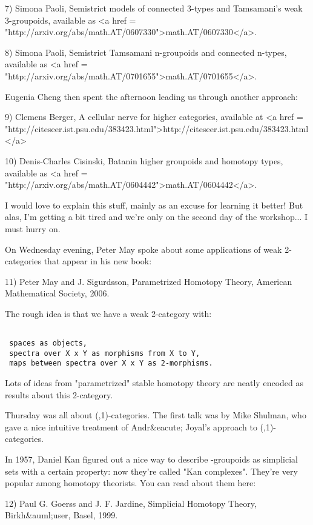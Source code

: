 7) Simona Paoli, Semistrict models of connected 3-types and 
Tamsamani's weak 3-groupoids, available as 
<a href = "http://arxiv.org/abs/math.AT/0607330">math.AT/0607330</a>.

8) Simona Paoli, Semistrict Tamsamani n-groupoids and connected 
n-types, available as 
<a href = "http://arxiv.org/abs/math.AT/0701655">math.AT/0701655</a>.

Eugenia Cheng then spent the afternoon leading us through another
approach:

9) Clemens Berger, A cellular nerve for higher categories, 
available at <a href = "http://citeseer.ist.psu.edu/383423.html">http://citeseer.ist.psu.edu/383423.html</a>

10) Denis-Charles Cisinski, Batanin higher groupoids and homotopy 
types, available as <a href = "http://arxiv.org/abs/math.AT/0604442">math.AT/0604442</a>.

I would love to explain this stuff, mainly as an excuse for 
learning it better!  But alas, I'm getting a bit tired and we're
only on the second day of the workshop... I must hurry on.

On Wednesday evening, Peter May spoke about some applications of
weak 2-categories that appear in his new book:

11) Peter May and J. Sigurdsson, Parametrized Homotopy Theory,
American Mathematical Society, 2006.

The rough idea is that we have a weak 2-category with:


\begin{verbatim}

 spaces as objects,
 spectra over X x Y as morphisms from X to Y,
 maps between spectra over X x Y as 2-morphisms.
\end{verbatim}
    

Lots of ideas from "parametrized" stable homotopy theory
are neatly encoded as results about this 2-category.

Thursday was all about (\infty ,1)-categories.  The first talk was by
Mike Shulman, who gave a nice intuitive treatment of Andr&eacute;
Joyal's approach to (\infty ,1)-categories.

In 1957, Daniel Kan figured out a nice way to describe
\infty -groupoids as simplicial sets with a certain property: now
they're called "Kan complexes".  They're very popular among
homotopy theorists.  You can read about them here:

12) Paul G. Goerss and J. F. Jardine, Simplicial Homotopy Theory, 
Birkh&auml;user, Basel, 1999.

